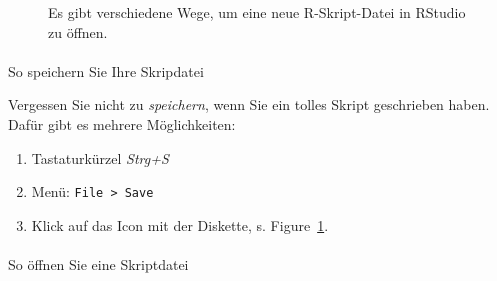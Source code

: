 \documentclass[
  letterpaper,
  DIV=11,
  numbers=noendperiod]{scrartcl}
\makeatletter
\let\oldparagraph\paragraph
\renewcommand{\paragraph}{
    \@ifstar
      \xxxParagraphStar
      \xxxParagraphNoStar
  }
\newcommand{\xxxParagraphStar}[1]{\oldparagraph*{#1}\mbox{}}
\newcommand{\xxxParagraphNoStar}[1]{\oldparagraph{#1}\mbox{}}
\providecommand{\tightlist}{%
  \setlength{\itemsep}{0pt}\setlength{\parskip}{0pt}}\usepackage{longtable,booktabs,array}
\theoremstyle{definition}
\theoremstyle{definition}
\theoremstyle{definition}
\theoremstyle{remark}
\makeatother
\begin{document}
\begin{figure}

\begin{minipage}{0.50\linewidth}



\end{minipage}%
%
\begin{minipage}{0.50\linewidth}
\end{minipage}%
\newline
\begin{minipage}{0.50\linewidth}
\end{minipage}%

\caption{\label{fig-script-new}Es gibt verschiedene Wege, um eine neue
R-Skript-Datei in RStudio zu öffnen.}

\end{figure}%

\paragraph{So speichern Sie Ihre
Skripdatei}\label{so-speichern-sie-ihre-skripdatei}

Vergessen Sie nicht zu \emph{speichern}, wenn Sie ein tolles Skript
geschrieben haben. Dafür gibt es mehrere Möglichkeiten:

\begin{enumerate}
\def\labelenumi{\arabic{enumi}.}
\tightlist
\item
  Tastaturkürzel \emph{Strg+S}
\item
  Menü: \texttt{File\ \textgreater{}\ Save}
\item
  Klick auf das Icon mit der Diskette, s. Figure~\ref{fig-script-new}.
\end{enumerate}

\paragraph{So öffnen Sie eine
Skriptdatei}\label{so-uxf6ffnen-sie-eine-skriptdatei}
\end{document}
